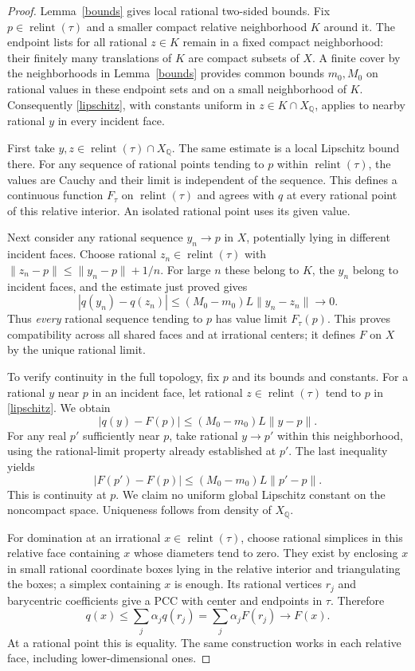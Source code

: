 \documentclass[11pt]{article}
\newcommand{\Q}{\mathbb Q}
\newcommand{\relint}{\operatorname{relint}}
\begin{document}
\begin{proof}
Lemma~\ref{bounds} gives local rational two-sided bounds. Fix $p\in\relint(\tau)$ and a smaller compact relative neighborhood $K$ around it. The endpoint lists for all rational $z\in K$ remain in a fixed compact neighborhood: their finitely many translations of $K$ are compact subsets of $X$. A finite cover by the neighborhoods in Lemma~\ref{bounds} provides common bounds $m_0,M_0$ on rational values in these endpoint sets and on a small neighborhood of $K$. Consequently \eqref{lipschitz}, with constants uniform in $z\in K\cap X_\Q$, applies to nearby rational $y$ in every incident face.

First take $y,z\in\relint(\tau)\cap X_\Q$. The same estimate is a local Lipschitz bound there. For any sequence of rational points tending to $p$ within $\relint(\tau)$, the values are Cauchy and their limit is independent of the sequence. This defines a continuous function $F_\tau$ on $\relint(\tau)$ and agrees with $q$ at every rational point of this relative interior. An isolated rational point uses its given value.

Next consider any rational sequence $y_n\to p$ in $X$, potentially lying in different incident faces. Choose rational $z_n\in\relint(\tau)$ with $\|z_n-p\|\leq\|y_n-p\|+1/n$. For large $n$ these belong to $K$, the $y_n$ belong to incident faces, and the estimate just proved gives
\[|q(y_n)-q(z_n)|\leq (M_0-m_0)L\|y_n-z_n\|\longrightarrow0.
\]
Thus \emph{every} rational sequence tending to $p$ has value limit $F_\tau(p)$. This proves compatibility across all shared faces and at irrational centers; it defines $F$ on $X$ by the unique rational limit.

To verify continuity in the full topology, fix $p$ and its bounds and constants. For a rational $y$ near $p$ in an incident face, let rational $z\in\relint(\tau)$ tend to $p$ in \eqref{lipschitz}. We obtain
\[|q(y)-F(p)|\leq (M_0-m_0)L\|y-p\|.
\]
For any real $p'$ sufficiently near $p$, take rational $y\to p'$ within this neighborhood, using the rational-limit property already established at $p'$. The last inequality yields
\[|F(p')-F(p)|\leq (M_0-m_0)L\|p'-p\|.
\]
This is continuity at $p$. We claim no uniform global Lipschitz constant on the noncompact space. Uniqueness follows from density of $X_\Q$.

For domination at an irrational $x\in\relint(\tau)$, choose rational simplices in this relative face containing $x$ whose diameters tend to zero. They exist by enclosing $x$ in small rational coordinate boxes lying in the relative interior and triangulating the boxes; a simplex containing $x$ is enough. Its rational vertices $r_j$ and barycentric coefficients give a PCC with center and endpoints in $\tau$. Therefore
\[q(x)\leq\sum_j\alpha_j q(r_j)=\sum_j\alpha_j F(r_j)\longrightarrow F(x).
\]
At a rational point this is equality. The same construction works in each relative face, including lower-dimensional ones.


\end{proof}
\end{document}
